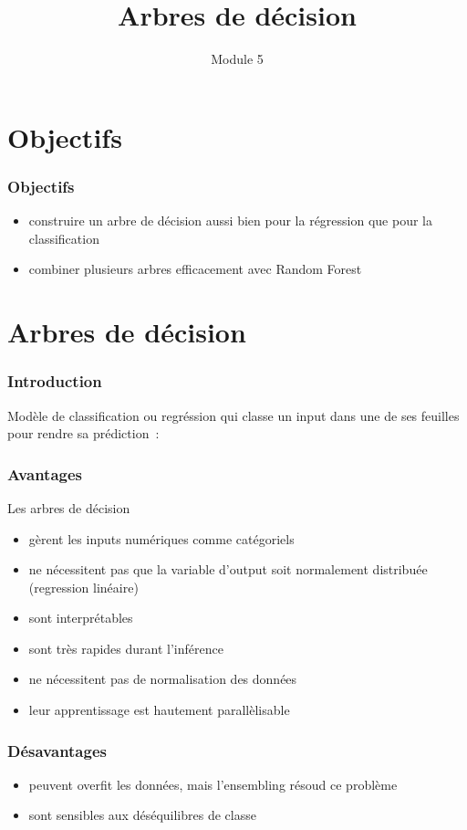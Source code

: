 \documentclass{formation}
\title{Arbres de décision}
\subtitle{Module 5}
\begin{document}
\maketitle

\section{Objectifs}

\begin{frame}
  \frametitle{Objectifs}
  \begin{itemize}
  \item construire un arbre de décision aussi bien pour la régression
    que pour la classification
  \item combiner plusieurs arbres efficacement avec Random Forest
  \end{itemize}
\end{frame}

\section{Arbres de décision}

\begin{frame}
  \frametitle{Introduction}
  Modèle de classification ou regréssion qui classe un input dans une
  de ses feuilles pour rendre sa prédiction :
\end{frame}

\begin{frame}
  \frametitle{Avantages}
  Les arbres de décision
  \begin{itemize}[<+->]
  \item gèrent les inputs numériques comme catégoriels
  \item ne nécessitent pas que la variable d'output soit normalement
    distribuée (regression linéaire)
  \item sont interprétables
  \item sont très rapides durant l'inférence
  \item ne nécessitent pas de normalisation des données
  \item leur apprentissage est hautement parallèlisable
  \end{itemize}
\end{frame}

\begin{frame}
  \frametitle{Désavantages}

  \begin{itemize}[<+->]
  \item peuvent overfit les données, mais l'ensembling résoud ce
    problème
  \item sont sensibles aux déséquilibres de classe
  \end{itemize}
\end{frame}
\end{document}
